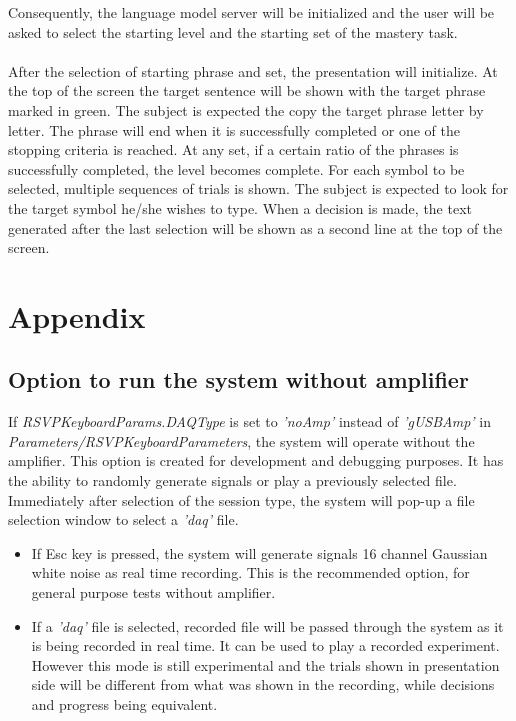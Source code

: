 \documentclass[12pt,letterpaper]{report}
\begin{document}
Consequently, the language model server will be initialized and the user will be asked to select the starting level and the starting set of the mastery task.\\
\\

After the selection of starting phrase and set, the presentation will initialize. At the top of the screen the target sentence will be shown with the target phrase marked in green. The subject is expected the copy the target phrase letter by letter. The phrase will end when it is successfully completed or one of the stopping criteria is reached. At any set, if a certain ratio of the phrases is successfully completed, the level becomes complete. For each symbol to be selected, multiple sequences of trials is shown. The subject is expected to look for the target symbol he/she wishes to type. When a decision is made, the text generated after the last selection will be shown as a second line at the top of the screen.
\chapter{Appendix}
\section{Option to run the system without amplifier}
If \textit{RSVPKeyboardParams.DAQType} is set to \textit{'noAmp'} instead of \textit{'gUSBAmp'} in \textit{Parameters/RSVPKeyboardParameters}, the system will operate without the amplifier. This option is created for development and debugging purposes. It has the ability to randomly generate signals or play a previously selected file. Immediately after selection of the session type, the system will pop-up a file selection window to select a \textit{'daq'} file. 
\begin{itemize}
\item{If Esc key is pressed, the system will generate signals 16 channel Gaussian white noise as real time recording. This is the recommended option, for general purpose tests without amplifier.}
\item{If a \textit{'daq'} file is selected, recorded file will be passed through the system as it is being recorded in real time. It can be used to play a recorded experiment. However this mode is still experimental and the trials shown in presentation side will be different from what was shown in the recording, while decisions and progress being equivalent.}
\end{itemize}
\end{document}
